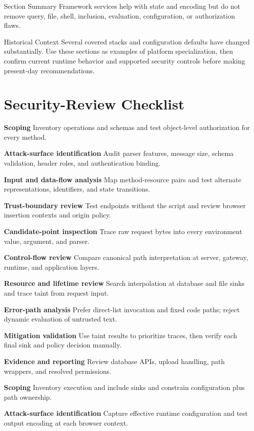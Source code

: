 \documentclass[11pt,letterpaper]{article}
\begin{document}
\begin{CornellSummaryBox}{Section Summary}
Framework services help with state and encoding but do not remove query, file, shell, inclusion, evaluation, configuration, or authorization flaws.
\end{CornellSummaryBox}
\begin{CornellLegacyBox}{Historical Context}
Several covered stacks and configuration defaults have changed substantially. Use these sections as examples of platform specialization, then confirm current runtime behavior and supported security controls before making present-day recommendations.
\end{CornellLegacyBox}
\section{Security-Review Checklist}
\begin{CornellChecklist}
\item \textbf{Scoping}
Inventory operations and schemas and test object-level authorization for every method.
\item \textbf{Attack-surface identification}
Audit parser features, message size, schema validation, header roles, and authentication binding.
\item \textbf{Input and data-flow analysis}
Map method-resource pairs and test alternate representations, identifiers, and state transitions.
\item \textbf{Trust-boundary review}
Test endpoints without the script and review browser insertion contexts and origin policy.
\item \textbf{Candidate-point inspection}
Trace raw request bytes into every environment value, argument, and parser.
\item \textbf{Control-flow review}
Compare canonical path interpretation at server, gateway, runtime, and application layers.
\item \textbf{Resource and lifetime review}
Search interpolation at database and file sinks and trace taint from request input.
\item \textbf{Error-path analysis}
Prefer direct-list invocation and fixed code paths; reject dynamic evaluation of untrusted text.
\item \textbf{Mitigation validation}
Use taint results to prioritize traces, then verify each final sink and policy decision manually.
\item \textbf{Evidence and reporting}
Review database APIs, upload handling, path wrappers, and resolved permissions.
\item \textbf{Scoping}
Inventory execution and include sinks and constrain configuration plus path ownership.
\item \textbf{Attack-surface identification}
Capture effective runtime configuration and test output encoding at each browser context.
\end{CornellChecklist}
\end{document}
